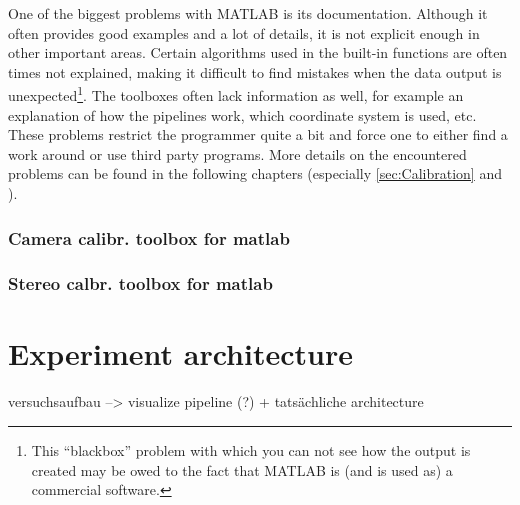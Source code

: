 One of the biggest problems with MATLAB is its documentation. Although it often provides good examples and a lot of details, it is not explicit enough in other important areas. Certain algorithms used in the built-in functions are often times not explained, making it difficult to find mistakes when the data output is unexpected\footnote{This \enquote{blackbox} problem with which you can not see how the output is created may be owed to the fact that MATLAB is (and is used as) a commercial software.}. The toolboxes often lack information as well, for example an explanation of how the pipelines work, which coordinate system is used, etc. These problems restrict the programmer quite a bit and force one to either find a work around or use third party programs. More details on the encountered problems can be found in the following chapters (especially \autoref{sec:Calibration} and ).

\subsubsection{Camera calibr. toolbox for matlab}
\subsubsection{Stereo calbr. toolbox for matlab}




\section{Experiment architecture} \label{sec:architecture}
versuchsaufbau --> visualize pipeline (?) + tatsächliche architecture
